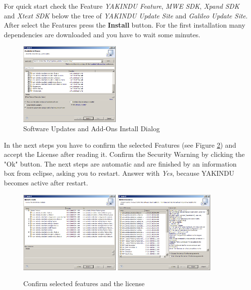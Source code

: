 For quick start check the Feature \textit{YAKINDU Feature}, \textit{MWE SDK}, 
\textit{Xpand SDK} and \textit{Xtext SDK} below the tree of
\textit{YAKINDU Update Site} and \textit{Galileo Update Site}. After select the 
Features press the \textbf{Install} button. For  the
first installation many dependencies are downloaded and you have to wait some
minutes.

\begin{figure}[ht]
\center
\includegraphics[width=0.45\textwidth]{./Pictures/updateSelected}
\caption{\label{fig:Update}Software Updates and Add-Ons Install Dialog} 
\end{figure}

In the next steps you have to confirm the selected Features (see Figure
\ref{fig:confirmFeatures}) and accept the License after reading it. Confirm the Security
Warning by clicking the "Ok" button. The next
steps are automatic and are finished by an information box from eclipse, asking
you to restart. Answer with \textit{Yes}, because YAKINDU becomes active after
restart.

\begin{figure}[ht] \center
\includegraphics[width=0.45\textwidth]{./Pictures/featureConfirm}
\includegraphics[width=0.45\textwidth]{./Pictures/licences}
\caption{\label{fig:confirmFeatures}Confirm selected features and the license} 
\end{figure}

